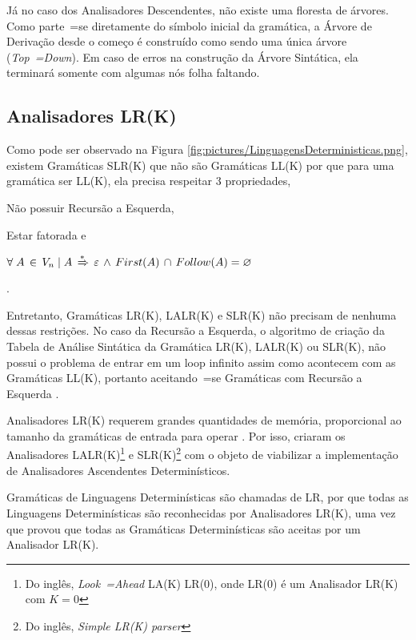 {    Já no caso dos Analisadores Descendentes,
    não existe uma floresta de árvores.
    Como parte~=se diretamente do símbolo inicial da gramática,
    a Árvore de Derivação desde o começo é construído como sendo uma única árvore (\textit{Top~=Down}).
    Em caso de erros na construção da Árvore Sintática,
    ela terminará somente com algumas nós folha faltando.


\subsection{Analisadores LR(K)}

    Como pode ser observado na Figura \ref{fig:pictures/LinguagensDeterministicas.png},
    existem Gramáticas SLR(K) que não são Gramáticas LL(K) por que para uma gramática ser LL(K),
    ela precisa respeitar 3 propriedades,
    \begin{inparaenum}
        \item Não possuir Recursão a Esquerda,
        \item Estar fatorada e
        \item $\forall\; A\, \in\, V_n\; |\; A\,
                \xRightarrow{*}\, \varepsilon\,
                \land\, First(A)\, \cap\, Follow(A) = \varnothing$
    \end{inparaenum}
    \cite{ahoCompilerDragonBook}.

    Entretanto,
    Gramáticas LR(K), LALR(K) e
    SLR(K) não precisam de nenhuma dessas restrições.
    No caso da Recursão a Esquerda,
    o algoritmo de criação da Tabela de Análise Sintática da Gramática LR(K),
    LALR(K) ou SLR(K),
    não possui o problema de entrar em um loop infinito assim como acontecem com as Gramáticas LL(K),
    portanto aceitando~=se Gramáticas com Recursão a Esquerda \cite{ahoCompilerDragonBook}.

    Analisadores LR(K) requerem grandes quantidades de memória,
    proporcional ao tamanho da gramáticas de entrada para operar \cite{complexityOfLRKTesting}.
    Por isso,
     criaram os Analisadores LALR(K)\footnote{
    Do inglês, \textit{Look~=Ahead} LA(K) LR(0),
    onde LR(0) é um Analisador LR(K) com $K=0$
    }
    e SLR(K)\footnote{
    Do inglês, \textit{Simple LR(K) parser}
    }
    com o objeto de viabilizar a implementação de Analisadores Ascendentes Determinísticos.

    Gramáticas de Linguagens Determinísticas são chamadas de LR,
    por que todas as Linguagens Determinísticas são reconhecidas por Analisadores LR(K),
    uma vez que  provou que todas as Gramáticas Determinísticas são aceitas por um Analisador LR(K).

}
